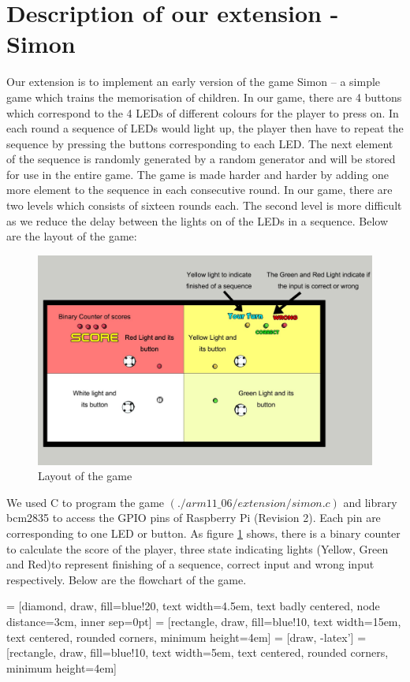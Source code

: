 \documentclass[11pt]{article}
\begin{document}
\section{Description of our extension - Simon}
Our extension is to implement an early version of the game Simon -- a simple game which trains the memorisation of children. In our game, there are 4 buttons which correspond to the 4 LEDs of different colours for the player to press on. In each round a sequence of LEDs would light up, the player then have to repeat the sequence by pressing the buttons corresponding to each LED. The next element of the sequence is randomly generated by a random generator and will be stored for use in the entire game. The game is made harder and harder by adding one more element to the sequence in each consecutive round. In our game, there are two levels which consists of sixteen rounds each. The second level is more difficult as we reduce the delay between the lights on of the LEDs in a sequence. Below are the layout of the game:
\begin{figure}[h!]
\centering
\includegraphics[width = 0.75\linewidth]{TOP1.jpg}
\caption{Layout of the game}
\label{fig::layout}
\end{figure}

We used C to program the game $(./arm11{\_}06/extension/simon.c)$ and library bcm2835 to access the GPIO pins of Raspberry Pi (Revision 2). Each pin are corresponding to one LED or button. As figure \ref{fig::layout} shows, there is a binary counter to calculate the score of the player, three state indicating lights (Yellow, Green and Red)to represent finishing of a sequence, correct input and wrong input respectively. Below are the flowchart of the game.

 = [diamond, draw, fill=blue!20,
   text width=4.5em, text badly centered, node distance=3cm, inner sep=0pt]
 = [rectangle, draw, fill=blue!10,
   text width=15em, text centered, rounded corners, minimum height=4em]
 = [draw, -latex']
 = [rectangle, draw, fill=blue!10,
   text width=5em, text centered, rounded corners, minimum height=4em]
 
\end{document}
